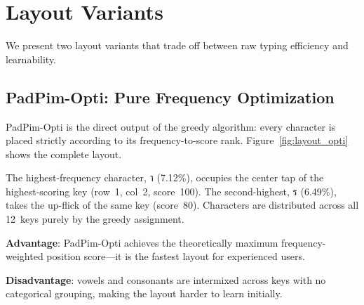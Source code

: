 \documentclass[10pt,twocolumn,a4paper]{article}
\newcommand{\thai}[1]{{\thaifont #1}}
\begin{document}
\section{Layout Variants}
\label{sec:variants}

We present two layout variants that trade off between raw typing efficiency and learnability.

\subsection{PadPim-Opti: Pure Frequency Optimization}
\label{sec:opti}

PadPim-Opti is the direct output of the greedy algorithm: every character is placed strictly according to its frequency-to-score rank.
Figure~\ref{fig:layout_opti} shows the complete layout.

The highest-frequency character, \thai{า} (7.12\%), occupies the center tap of the highest-scoring key (row~1, col~2, score~100).
The second-highest, \thai{ร} (6.49\%), takes the up-flick of the same key (score~80).
Characters are distributed across all 12~keys purely by the greedy assignment.

\textbf{Advantage}: PadPim-Opti achieves the theoretically maximum frequency-weighted position score---it is the fastest layout for experienced users.

\textbf{Disadvantage}: vowels and consonants are intermixed across keys with no categorical grouping, making the layout harder to learn initially.
\end{document}
